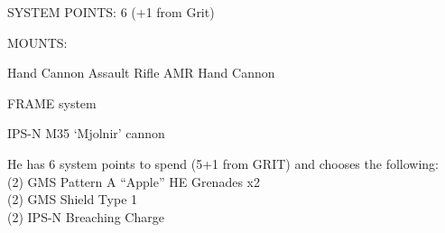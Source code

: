                                      SYSTEM POINTS: 6 (+1 from Grit)

                                                   MOUNTS:

 Hand Cannon
                       Assault Rifle                           AMR
 Hand Cannon

                                                FRAME system




                                          IPS-N M35 ‘Mjolnir’ cannon

He has 6 system points to spend (5+1 from GRIT) and chooses the following:\\
(2) GMS Pattern A “Apple” HE Grenades x2\\
(2) GMS Shield Type 1\\
(2) IPS-N Breaching Charge
